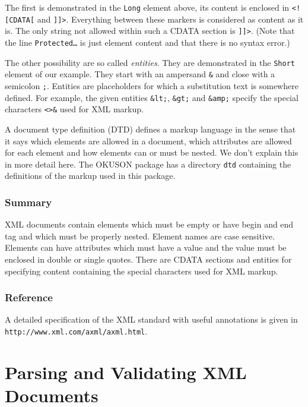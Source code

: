 \documentclass[12pt,openany,a4paper]{book}
\newcommand{\OKUSON}{\textsf{OKUSON}}
\begin{document}
The first is demonstrated in the \texttt{Long} element above, its content is
enclosed in \texttt{<![CDATA[} and \texttt{]]>}. Everything between these
markers is considered as content as it is. The only string not allowed
within such a CDATA section is \texttt{]]>}. (Note that the line
\texttt{Protected\ldots} is just element content and that there is no syntax
error.)

The other possibility are so called \emph{entities}. They are demonstrated
in the \texttt{Short} element of our example. They start with an ampersand
\texttt{\&} and close with a semicolon \texttt{;}. Entities are placeholders
for which a substitution text is somewhere defined. For example, the given
entities \texttt{\&lt;}, \texttt{\&gt;} and \texttt{\&amp;} specify the special
characters \texttt{<>\&} used for XML markup.

A document type definition (DTD) defines a markup language in the sense that
it says which elements are allowed in a document, which attributes are
allowed for each element and how elements can or must be nested. We don't
explain this in more detail here. The {\OKUSON} package has a directory
\texttt{dtd} containing the definitions of the markup used in this package.

\subsubsection*{Summary}
XML documents contain elements which must be empty or have begin and end
tag and which must be properly nested. Element names are case sensitive.
Elements can have attributes which
must have a value and the value must be enclosed in double or single quotes.
There are CDATA sections and entities for specifying content containing the
special characters used for XML markup.

\subsubsection*{Reference}
A detailed specification of the XML standard with useful annotations
is given in\\
\mbox{}\hspace{1in}\texttt{http://www.xml.com/axml/axml.html}.

\section{Parsing and Validating XML Documents}\label{sec:valXML}
\end{document}
